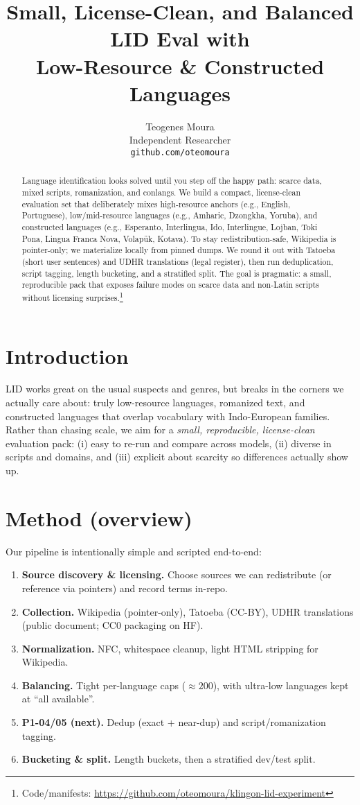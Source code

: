\documentclass[11pt]{article}
\title{Small, License-Clean, and Balanced LID Eval with\\ Low-Resource \& Constructed Languages}
\author{
  Teogenes Moura \\
  Independent Researcher \\
  \texttt{\small github.com/oteomoura}
}
\begin{document}
\maketitle

\begin{abstract}
Language identification looks solved until you step off the happy path: scarce data, mixed scripts, romanization, and conlangs. We build a compact, license-clean evaluation set that deliberately mixes high-resource anchors (e.g., English, Portuguese), low/mid-resource languages (e.g., Amharic, Dzongkha, Yoruba), and constructed languages (e.g., Esperanto, Interlingua, Ido, Interlingue, Lojban, Toki Pona, Lingua Franca Nova, Volapük, Kotava). To stay redistribution-safe, Wikipedia is pointer-only; we materialize locally from pinned dumps. We round it out with Tatoeba (short user sentences) and UDHR translations (legal register), then run deduplication, script tagging, length bucketing, and a stratified split. The goal is pragmatic: a small, reproducible pack that exposes failure modes on scarce data and non-Latin scripts without licensing surprises.\footnote{Code/manifests: \url{https://github.com/oteomoura/klingon-lid-experiment}}
\end{abstract}

\section{Introduction}
LID works great on the usual suspects and genres, but breaks in the corners we actually care about: truly low-resource languages, romanized text, and constructed languages that overlap vocabulary with Indo-European families. Rather than chasing scale, we aim for a \emph{small, reproducible, license-clean} evaluation pack:
(i) easy to re-run and compare across models,
(ii) diverse in scripts and domains, and
(iii) explicit about scarcity so differences actually show up.

\section{Method (overview)}
Our pipeline is intentionally simple and scripted end-to-end:
\begin{enumerate}
  \item \textbf{Source discovery \& licensing.} Choose sources we can redistribute (or reference via pointers) and record terms in-repo.
  \item \textbf{Collection.} Wikipedia (pointer-only), Tatoeba (CC-BY), UDHR translations (public document; CC0 packaging on HF).
  \item \textbf{Normalization.} NFC, whitespace cleanup, light HTML stripping for Wikipedia.
  \item \textbf{Balancing.} Tight per-language caps (\(\approx 200\)), with ultra-low languages kept at “all available”.
  \item \textbf{P1-04/05 (next).} Dedup (exact + near-dup) and script/romanization tagging.
  \item \textbf{Bucketing \& split.} Length buckets, then a stratified dev/test split.
\end{enumerate}
\end{document}
